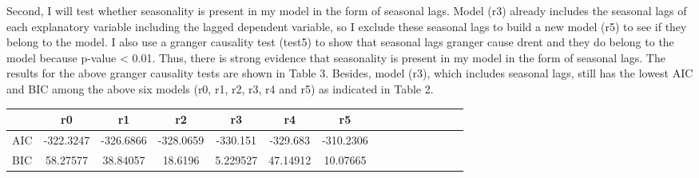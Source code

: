 \documentclass[12pt, times]{article}
\renewcommand{\baselinestretch}{1.5}
\begin{document}
\hspace{1.5em}Second, I will test whether seasonality is present in my model in the form of seasonal lags. Model (r3) already includes the seasonal lags of each explanatory variable including the lagged dependent variable, so I exclude these seasonal lags to build a new model (r5) to see if they belong to the model. I also use a granger causality test (test5) to show that seasonal lags granger cause drent and they do belong to the model because p-value < 0.01. Thus, there is strong evidence that seasonality is present in my model in the form of seasonal lags. The results for the above granger causality tests are shown in Table 3. Besides, model (r3), which includes seasonal lags, still has the lowest AIC and BIC among the above six models (r0, r1, r2, r3, r4 and r5) as indicated in Table 2.

\renewcommand{\baselinestretch}{0.5}
\label{1}
  \begin{scriptsize}
  \begin{center}
  \tabcolsep 15pt
    \begin{tabular}{lcccccccccccccc}
    \toprule
            & r0 & r1 & r2 & r3 & r4 & r5 \\
\midrule
AIC      & -322.3247	& -326.6866 & -328.0659 & -330.151 & -329.683 & -310.2306 
\\
BIC      & 58.27577	& 38.84057 & 18.6196 & 5.229527 & 47.14912 & 10.07665 \\
\bottomrule													
    \end{tabular}
    \end{center}
  \end{scriptsize}
\end{document}

